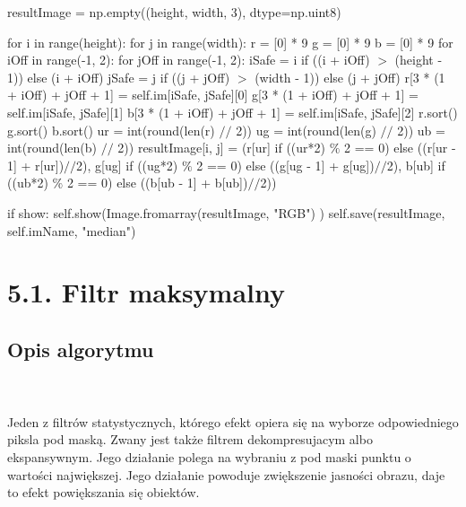 \documentclass[final,a4paper,openany,12pt]{mwbk}
\begin{document}
resultImage = np.empty((height, width, 3), dtype=np.uint8) \newline

for i in range(height): \newline
\indent for j in range(width): \newline
\indent r = [0] * 9 \newline
\indent g = [0] * 9 \newline
\indent b = [0] * 9 \newline
\indent for iOff in range(-1, 2): \newline
\indent for jOff in range(-1, 2): \newline
\indent iSafe = i if ((i + iOff) $>$ (height - 1)) else (i + iOff) \newline
\indent jSafe = j if ((j + jOff) $>$ (width - 1)) else (j + jOff) \newline
\indent r[3 * (1 + iOff) + jOff + 1] = self.im[iSafe, jSafe][0] \newline
\indent g[3 * (1 + iOff) + jOff + 1] = self.im[iSafe, jSafe][1] \newline
\indent b[3 * (1 + iOff) + jOff + 1] = self.im[iSafe, jSafe][2] \newline
\indent r.sort() \newline
\indent g.sort() \newline
\indent b.sort() \newline
\indent ur = int(round(len(r) $//$ 2)) \newline
\indent ug = int(round(len(g) $//$ 2)) \newline
\indent ub = int(round(len(b) $//$ 2)) \newline
\indent resultImage[i, j] = (r[ur] if ((ur*2) $\%$ 2 == 0) else ((r[ur - 1] + r[ur])$//$2), g[ug] if ((ug*2) $\%$ 2 == 0) else ((g[ug - 1] + g[ug])$//$2), b[ub] if ((ub*2) $\%$ 2 == 0) else ((b[ub - 1] + b[ub])$//$2)) \newline

if show: \newline
\indent self.show(Image.fromarray(resultImage, "RGB") \newline)
\indent self.save(resultImage, self.imName, "median") \newline

\newpage
\section*{5.1. Filtr maksymalny}
\subsection*{Opis algorytmu}
\hfill
\\\\
\indent  Jeden z filtrów statystycznych, którego efekt opiera się na wyborze odpowiedniego piksla pod maską. Zwany jest także filtrem dekompresujacym albo ekspansywnym. Jego działanie polega na wybraniu z pod maski punktu o wartości największej. Jego działanie powoduje zwiększenie jasności obrazu, daje to efekt powiększania się obiektów.
\end{document}
